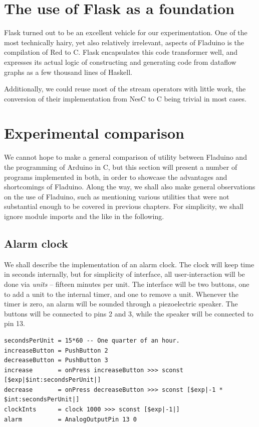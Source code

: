 \documentclass[a4paper, oneside, final]{memoir}
\begin{document}
\section{The use of Flask as a foundation}

Flask turned out to be an excellent vehicle for our experimentation.
One of the most technically hairy, yet also relatively irrelevant,
aspects of Fladuino is the compilation of Red to C.  Flask
encapsulates this code transformer well, and expresses its actual
logic of constructing and generating code from dataflow graphs as a
few thousand lines of Haskell.

Additionally, we could reuse most of the stream operators with little
work, the conversion of their implementation from NesC to C being
trivial in most cases.

\section{Experimental comparison}

We cannot hope to make a general comparison of utility between
Fladuino and the programming of Arduino in C, but this section will
present a number of programs implemented in both, in order to showcase
the advantages and shortcomings of Fladuino.  Along the way, we shall
also make general observations on the use of Fladuino, such as
mentioning various utilities that were not substantial enough to be
covered in previous chapters.  For simplicity, we shall ignore module
imports and the like in the following.

\subsection{Alarm clock}

We shall describe the implementation of an alarm clock.  The clock
will keep time in seconds internally, but for simplicity of interface,
all user-interaction will be done via \textit{units} -- fifteen
minutes per unit.  The interface will be two buttons, one to add a
unit to the internal timer, and one to remove a unit.  Whenever the
timer is zero, an alarm will be sounded through a piezoelectric
speaker.  The buttons will be connected to pins 2 and 3, while the
speaker will be connected to pin 13.

\begin{verbatim}
secondsPerUnit = 15*60 -- One quarter of an hour.
increaseButton = PushButton 2
decreaseButton = PushButton 3
increase       = onPress increaseButton >>> sconst [$exp|$int:secondsPerUnit|]
decrease       = onPress decreaseButton >>> sconst [$exp|-1 * $int:secondsPerUnit|]
clockInts      = clock 1000 >>> sconst [$exp|-1|]
alarm          = AnalogOutputPin 13 0
\end{verbatim}
\end{document}
